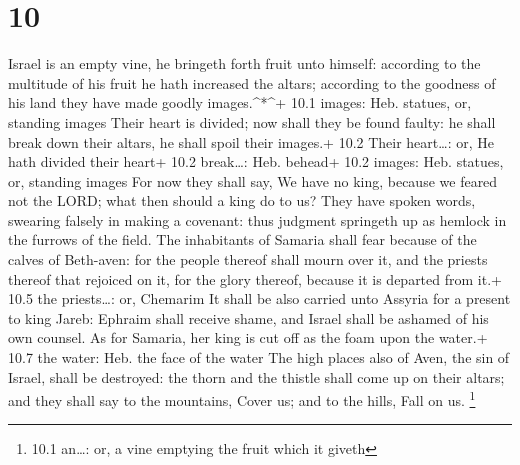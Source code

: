 \hypertarget{section-9}{%
\section{10}\label{section-9}}

 Israel is an empty vine, he bringeth forth fruit unto
himself: according to the multitude of his fruit he hath increased the
altars; according to the goodness of his land they have made goodly
images.\^{}*\^{}+ 10.1 images: Heb. statues, or, standing images
 Their heart is divided; now shall they be found faulty: he
shall break down their altars, he shall spoil their images.+ 10.2 Their
heart\ldots: or, He hath divided their heart+ 10.2 break\ldots: Heb.
behead+ 10.2 images: Heb. statues, or, standing images  For
now they shall say, We have no king, because we feared not the LORD;
what then should a king do to us?  They have spoken words,
swearing falsely in making a covenant: thus judgment springeth up as
hemlock in the furrows of the field.  The inhabitants of
Samaria shall fear because of the calves of Beth-aven: for the people
thereof shall mourn over it, and the priests thereof that rejoiced on
it, for the glory thereof, because it is departed from it.+ 10.5 the
priests\ldots: or, Chemarim  It shall be also carried unto
Assyria for a present to king Jareb: Ephraim shall receive shame, and
Israel shall be ashamed of his own counsel.  As for Samaria,
her king is cut off as the foam upon the water.+ 10.7 the water: Heb.
the face of the water  The high places also of Aven, the sin
of Israel, shall be destroyed: the thorn and the thistle shall come up
on their altars; and they shall say to the mountains, Cover us; and to
the hills, Fall on us. \footnote{10.1 an\ldots: or, a vine emptying the
  fruit which it giveth}

